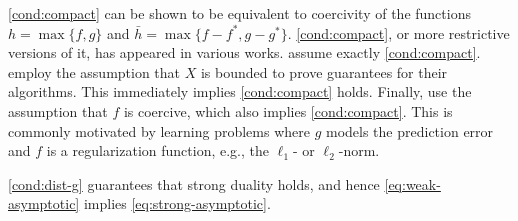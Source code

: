 \documentclass[11pt,oneside]{article}
\theoremstyle{plain}
\theoremstyle{plain}
\theoremstyle{plain}%
\begin{document}
{\cref{cond:compact} can be shown to be equivalent to coercivity of the functions $h = \max\{f,g\}$ and $\bar{h} = \max\{f-f^*,g-g^*\}$. \cref{cond:compact}, or more restrictive versions of it, has appeared in various works. \citet{Cabot2005,Solodov2006,SolodovMikhail2007,Malitsky2017,DempeEtAl2019} assume exactly \cref{cond:compact}. \citet{HelouSimões2017,AminiEtAl2019,KaushikYousefian2021,ShenLingqing2023,GiangTranEtAL2024,JiangEtAl2023,CaoEtAl2024} employ the assumption that $X$ is bounded to prove guarantees for their algorithms. This immediately implies \cref{cond:compact} holds. Finally, \citet{BeckSabach2014,SabachEtAl2017,ShehuEtAl2021,DoronShtern2022,MerchavSabach2023} use the assumption that $f$ is coercive, which also implies \cref{cond:compact}. This is commonly motivated by learning problems where $g$ models the prediction error and $f$ is a regularization function, e.g., the $\ell_1$- or $\ell_2$-norm.

\cref{cond:dist-g} guarantees that strong duality holds, and hence \cref{eq:weak-asymptotic} implies \cref{eq:strong-asymptotic}.

}
\end{document}
